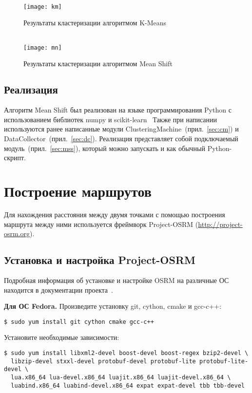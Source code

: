 \begin{figure}[hp!]
    \center
    \texttt{[image: km]}\\
    \parbox{.8\textwidth}{\centering
        \caption{Результаты кластеризации алгоритмом K-Means} \label{pic:1}}\\
    \texttt{[image: mn]}\\
    \parbox{.8\textwidth}{\centering
        \caption{Результаты кластеризации алгоритмом Mean Shift} \label{pic:2}}
\end{figure}

\section{Реализация}
Алгоритм Mean Shift был реализован на языке программирования Python с использованием
библиотек numpy и scikit-learn~\cite{scikit} Также при написании ис\-поль\-зуют\-ся ранее написанные модули
ClusteringMachine~(прил.~\ref{sec:cm}) и\\ DataCollector~(прил.~\ref{sec:dc}).
Реали\-за\-ция пред\-став\-ляет собой подключаемый модуль~(прил.~\ref{sec:mss}),
который можно запускать и как обыч\-ный Python-скрипт.

\newpage

\chapter{Построение маршрутов}
Для нахождения расстояния между двумя точками с помощью построения маршрута между ними используется
фреймворк Project-OSRM ({\small\url{http://project-osrm.org}}).

\section{Установка и настройка Project-OSRM}
Подробная информация об установке и настройке OSRM на различные ОС находится в документации
проекта~\cite{osrm}.

\textbf{Для ОС Fedora.}
Произведите установку git, cython, cmake и gcc-c++:
\begin{lstlisting}
$ sudo yum install git cython cmake gcc-c++
\end{lstlisting}

Установите необходимые зависимости:
\begin{lstlisting}
$ sudo yum install libxml2-devel boost-devel boost-regex bzip2-devel \
  libzip-devel stxxl-devel protobuf-devel protobuf-lite protobuf-lite-devel \
  lua.x86_64 lua-devel.x86_64 luajit.x86_64 luajit-devel.x86_64 \
  luabind.x86_64 luabind-devel.x86_64 expat expat-devel tbb tbb-devel
\end{lstlisting}

